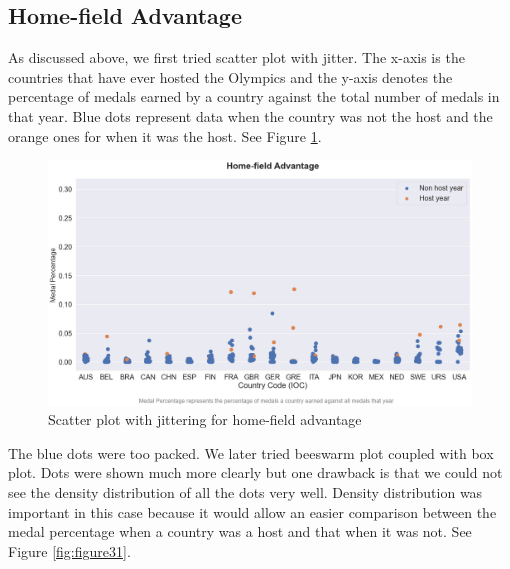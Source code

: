 \documentclass[
]{article}
\begin{document}
\hypertarget{plots-homefield}{%
\subsection{Home-field Advantage}\label{plots-homefield}}

As discussed above, we first tried scatter plot with jitter. The x-axis is the countries that have ever hosted the Olympics and the y-axis denotes the percentage of medals earned by a country against the total number of medals in that year. Blue dots represent data when the country was not the host and the orange ones for when it was the host. See Figure \ref{fig:figure30}.

\begin{figure}

{\centering \includegraphics[width=1\linewidth]{static/vis/g-2-7} 

}

\caption{Scatter plot with jittering for home-field advantage}\label{fig:figure30}
\end{figure}

The blue dots were too packed. We later tried beeswarm plot coupled with box plot. Dots were shown much more clearly but one drawback is that we could not see the density distribution of all the dots very well. Density distribution was important in this case because it would allow an easier comparison between the medal percentage when a country was a host and that when it was not. See Figure \ref{fig:figure31}.
\end{document}

